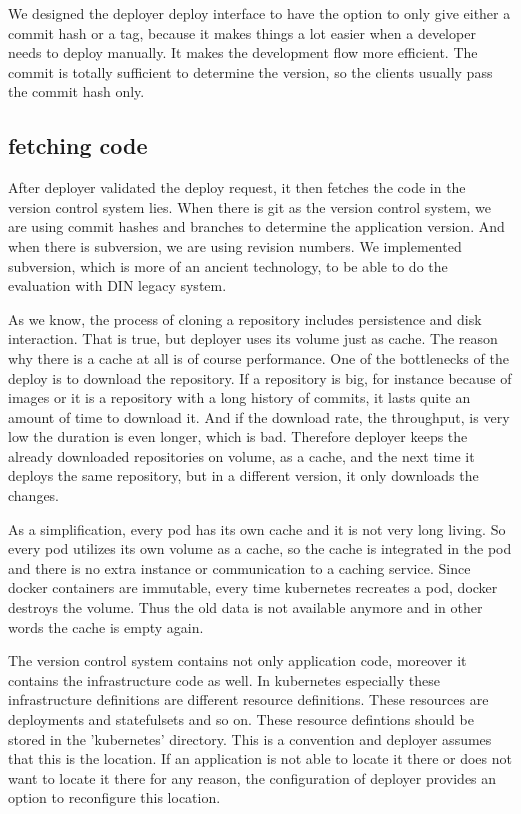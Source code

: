 We designed the deployer deploy interface to have the option to only give either a commit
hash or a tag, because it makes things a lot easier when a developer needs to deploy
manually. It makes the development flow more efficient. The commit is totally sufficient
to determine the version, so the clients usually pass the commit hash only.

\subsection{fetching code}
After deployer validated the deploy request, it then fetches the code in the version
control system lies. When there is git as the version control system, we are using commit
hashes and branches to determine the application version. And when there is subversion, we
are using revision numbers. We implemented subversion, which is more of an ancient
technology, to be able to do the evaluation with DIN legacy system.

As we know, the process of cloning a repository includes persistence and disk
interaction. That is true, but deployer uses its volume just as cache. The reason why
there is a cache at all is of course performance. One of the bottlenecks of the deploy is
to download the repository. If a repository is big, for instance because of images or it
is a repository with a long history of commits, it lasts quite an amount of time to
download it. And if the download rate, the throughput, is very low the duration is even
longer, which is bad. Therefore deployer keeps the already downloaded repositories on
volume, as a cache, and the next time it deploys the same repository, but in a different
version, it only downloads the changes.

As a simplification, every pod has its own cache and it is not very long living. So every
pod utilizes its own volume as a cache, so the cache is integrated in the pod and there is
no extra instance or communication to a caching service. Since docker containers are
immutable, every time kubernetes recreates a pod, docker destroys the volume. Thus the old
data is not available anymore and in other words the cache is empty again.

The version control system contains not only application code, moreover it contains the
infrastructure code as well. In kubernetes especially these infrastructure definitions are
different resource definitions. These resources are deployments and statefulsets and so
on. These resource defintions should be stored in the 'kubernetes' directory. This is a
convention and deployer assumes that this is the location. If an application is not able
to locate it there or does not want to locate it there for any reason, the configuration
of deployer provides an option to reconfigure this location.

